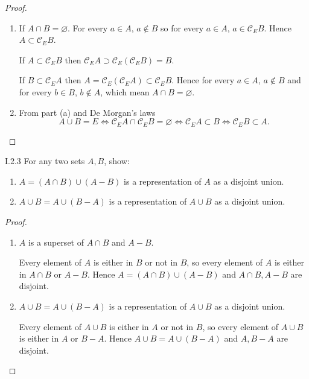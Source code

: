 \begin{proof}
	\begin{enumerate}[label={(\alph*)},leftmargin=*]
		\item If \( A \cap B = \varnothing \). For every \( a\in A \), \( a \notin B \) so for every \( a\in A \), \( a \in \mathscr{C}_{E}B \). Hence \( A \subset \mathscr{C}_{E}B \).

		      If \( A \subset \mathscr{C}_{E}B \) then \( \mathscr{C}_{E}A \supset \mathscr{C}_{E}(\mathscr{C}_{E}B) = B \).

		      If \( B \subset \mathscr{C}_{E}A \) then \( A = \mathscr{C}_{E}(\mathscr{C}_{E}A) \subset \mathscr{C}_{E}B \). Hence for every \( a\in A \), \( a \notin B \) and for every \( b \in B \), \( b \notin A \), which mean \( A\cap B = \varnothing \).
		\item From part (a) and De Morgan's laws
		      \[
			      A \cup B = E \iff \mathscr{C}_{E}A \cap \mathscr{C}_{E}B = \varnothing \iff \mathscr{C}_{E}A \subset B \iff \mathscr{C}_{E}B \subset A.
		      \]
	\end{enumerate}
\end{proof}

\begin{problem}{I.2.3}
For any two sets \( A, B \), show:
\begin{enumerate}[label={(\alph*)},leftmargin=*]
	\item \( A = (A\cap B) \cup (A - B) \) is a representation of \( A \) as a disjoint union.
	\item \( A \cup B = A \cup (B - A) \) is a representation of \( A \cup B \) as a disjoint union.
\end{enumerate}
\end{problem}

\begin{proof}
	\begin{enumerate}[label={(\alph*)},leftmargin=*]
		\item \( A \) is a superset of \( A\cap B \) and \( A - B \).

		      Every element of \( A \) is either in \( B \) or not in \( B \), so every element of \( A \) is either in \( A\cap B \) or \( A - B \). Hence \( A = (A \cap B) \cup (A - B) \) and \( A \cap B, A - B \) are disjoint.
		\item \( A \cup B = A \cup (B - A) \) is a representation of \( A \cup B \) as a disjoint union.

		      Every element of \( A\cup B \) is either in \( A \) or not in \( B \), so every element of \( A\cup B \) is either in \( A \) or \( B - A \). Hence \( A \cup B = A \cup (B - A) \) and \( A, B - A \) are disjoint.
	\end{enumerate}
\end{proof}

